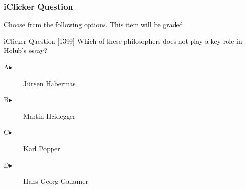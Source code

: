\begin{frame}
  \frametitle{iClicker Question}
Choose from the following options. This item will be graded.
\begin{block}{iClicker Question}
[1399] Which of these philosophers does not play a key role in Holub's essay?
\end{block}
\begin{description}
\item[A\hspace{.2in}$\blacktriangleright$] J{\"u}rgen Habermas
\item[B\hspace{.2in}$\blacktriangleright$] Martin Heidegger
\item[C\hspace{.2in}$\blacktriangleright$] Karl Popper
\item[D\hspace{.2in}$\blacktriangleright$] Hans-Georg Gadamer
\end{description}
\end{frame}

